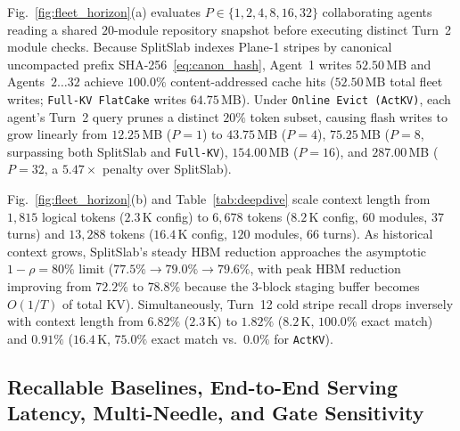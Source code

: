 \documentclass[10pt,journal,compsoc]{IEEEtran}
\theoremstyle{definition}
\theoremstyle{remark}
\newcommand{\SplitSlab}{\textup{\textsc{SplitSlab}}}
\def\SplitSlab{SplitSlab}%
\begin{document}
Fig.~\ref{fig:fleet_horizon}(a) evaluates $P \in \{1, 2, 4, 8, 16, 32\}$ collaborating agents reading a shared $20$-module repository snapshot before executing distinct Turn~2 module checks. Because \SplitSlab{} indexes Plane-1 stripes by canonical uncompacted prefix SHA-256~\eqref{eq:canon_hash}, Agent~1 writes $52.50$\,MB and Agents~$2\dots 32$ achieve $100.0\%$ content-addressed cache hits ($52.50$\,MB total fleet writes; \texttt{Full-KV FlatCake} writes $64.75$\,MB). Under \texttt{Online Evict (ActKV)}, each agent's Turn~2 query prunes a distinct $20\%$ token subset, causing flash writes to grow linearly from $12.25$\,MB ($P=1$) to $43.75$\,MB ($P=4$), $75.25$\,MB ($P=8$, surpassing both \SplitSlab{} and \texttt{Full-KV}), $154.00$\,MB ($P=16$), and $287.00$\,MB ($P=32$, a $5.47\times$ penalty over \SplitSlab{}).

Fig.~\ref{fig:fleet_horizon}(b) and Table~\ref{tab:deepdive} scale context length from $1{,}815$ logical tokens ($2.3$\,K config) to $6{,}678$ tokens ($8.2$\,K config, $60$ modules, $37$ turns) and $13{,}288$ tokens ($16.4$\,K config, $120$ modules, $66$ turns). As historical context grows, \SplitSlab{}'s steady HBM reduction approaches the asymptotic $1-\rho = 80\%$ limit ($77.5\% \to 79.0\% \to 79.6\%$, with peak HBM reduction improving from $72.2\%$ to $78.8\%$ because the $3$-block staging buffer becomes $O(1/T)$ of total KV). Simultaneously, Turn~12 cold stripe recall drops inversely with context length from $6.82\%$ ($2.3$\,K) to $1.82\%$ ($8.2$\,K, $100.0\%$ exact match) and $0.91\%$ ($16.4$\,K, $75.0\%$ exact match vs.\ $0.0\%$ for \texttt{ActKV}).

\subsection{Recallable Baselines, End-to-End Serving Latency, Multi-Needle, and Gate Sensitivity}\label{subsec:revision_eval}
\end{document}

